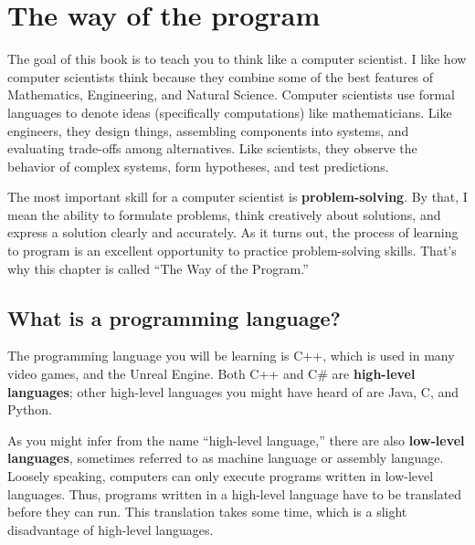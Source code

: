 

\chapter{The way of the program}

The goal of this book is to teach you to think like a
computer scientist.  I like how computer scientists think because
they combine some of the best features of Mathematics, Engineering,
and Natural Science.  Computer scientists use formal
languages to denote ideas (specifically computations) like mathematicians.  Like
engineers, they design things, assembling components into systems, and
evaluating trade-offs among alternatives.  Like scientists,
they observe the behavior of complex systems, form hypotheses, and test
predictions.

The most important skill for a computer scientist is {\bf
problem-solving}.  By that, I mean the ability to formulate problems,
think creatively about solutions, and express a solution clearly and
accurately.  As it turns out, the process of learning to program is an
excellent opportunity to practice problem-solving skills.  That's why
this chapter is called ``The Way of the Program.''

\section{What is a programming language?}

The programming language you will be learning is C++, which is used in many video games, and the Unreal Engine. Both C++ and C\# are
 {\bf high-level languages}; other high-level languages you might have 
heard of are Java, C, and Python.

As you might infer from the name ``high-level language,'' there are
also {\bf low-level languages}, sometimes referred to as machine
language or assembly language.  Loosely speaking, computers can only
execute programs written in low-level languages.  Thus, programs
written in a high-level language have to be translated before they can
run.  This translation takes some time, which is a slight disadvantage
of high-level languages.


